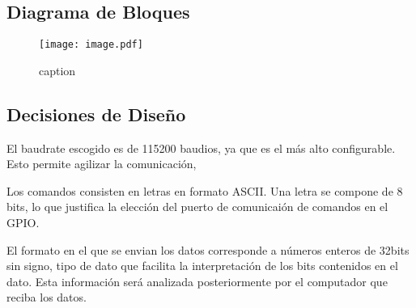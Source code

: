 \subsection{Diagrama de Bloques}

\begin{figure}[H]
	\centering
	\texttt{[image: image.pdf]}
	\caption{caption}
	\label{fig:}
\end{figure}


\subsection{Decisiones de Diseño}

El baudrate escogido es de 115200 baudios, ya que es el más alto configurable. Esto permite agilizar la comunicación,

Los comandos consisten en letras en formato ASCII. Una letra se compone de 8 bits, lo que justifica la elección del puerto de comunicaión de comandos en el GPIO.

El formato en el que se envian los datos corresponde a números enteros de 32bits sin signo, tipo de dato que facilita la interpretación de los bits contenidos en el dato. Esta información será analizada posteriormente por el computador que reciba los datos.

